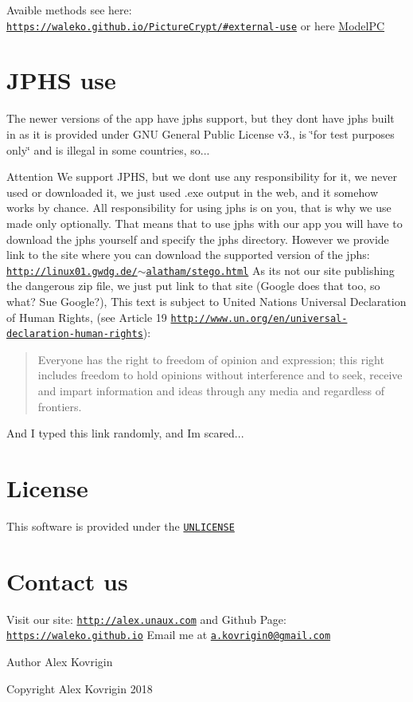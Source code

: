 Avaible methods see here\+: \href{https://waleko.github.io/PictureCrypt/#external-use}{\tt https\+://waleko.\+github.\+io/\+Picture\+Crypt/\#external-\/use} or here \mbox{\hyperlink{class_model_p_c}{Model\+PC}}\hypertarget{index_jphs-use}{}\section{J\+P\+H\+S use}\label{index_jphs-use}
The newer versions of the app have jphs support, but they don\textquotesingle{}t have jphs built in as it is provided under G\+NU General Public License v3., is \char`\"{}for test purposes only\char`\"{} and is illegal in some countries, so... \begin{DoxyAttention}{Attention}
We support J\+P\+HS, but we don\textquotesingle{}t use any responsibility for it, we never used or downloaded it, we just used .exe output in the web, and it somehow works by chance. All responsibility for using jphs is on you, that is why we use made only optionally. That means that to use jphs with our app you will have to download the jphs yourself and specify the jphs directory. However we provide link to the site where you can download the supported version of the jphs\+: \href{http://linux01.gwdg.de/~alatham/stego.html}{\tt http\+://linux01.\+gwdg.\+de/$\sim$alatham/stego.\+html} As it\textquotesingle{}s not our site publishing the dangerous zip file, we just put link to that site (Google does that too, so what? Sue Google?), This text is subject to United Nations\textquotesingle{} Universal Declaration of Human Rights, (see Article 19 \href{http://www.un.org/en/universal-declaration-human-rights}{\tt http\+://www.\+un.\+org/en/universal-\/declaration-\/human-\/rights})\+: \begin{quote}
Everyone has the right to freedom of opinion and expression; this right includes freedom to hold opinions without interference and to seek, receive and impart information and ideas through any media and regardless of frontiers. \end{quote}
And I typed this link randomly, and I\textquotesingle{}m scared...
\end{DoxyAttention}
\hypertarget{index_lic}{}\section{License}\label{index_lic}
This software is provided under the \href{http://unlicense.org}{\tt U\+N\+L\+I\+C\+E\+N\+SE}\hypertarget{index_contact}{}\section{Contact us}\label{index_contact}
Visit our site\+: \href{http://alex.unaux.com}{\tt http\+://alex.\+unaux.\+com} and Github Page\+: \href{https://waleko.github.io}{\tt https\+://waleko.\+github.\+io} Email me at \href{mailto:a.kovrigin0@gmail.com}{\tt a.\+kovrigin0@gmail.\+com}

\begin{DoxyAuthor}{Author}
Alex Kovrigin  
\end{DoxyAuthor}
\begin{DoxyCopyright}{Copyright}
Alex Kovrigin 2018 
\end{DoxyCopyright}
